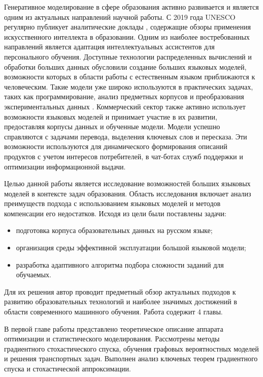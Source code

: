 Генеративное моделирование в сфере образования активно развивается и является одним из актуальных направлений научной работы. 
С 2019 года UNESCO регулярно публикует аналитические доклады \cite{annuvs2024education}\cite{unesco2019beijing},
содержащие обзоры применения искусственного интеллекта в образовании. Одним из наиболее востребованных направлений является адаптация
интеллектуальных ассистентов для персонального обучения. Доступные технологии распределенных вычислений и обработки больших данных обусловили 
создание больших языковых моделей, возможности которых в области работы с естественным языком приближаются к человеческим. Такие модели уже
широко используются в практических задачах, таких как программирование, анализ предметных корпусов и преобразования экспериментальных данных \cite{llamatouvron2023}. 
Коммерческий сектор также активно использует возможности языковых моделей и принимает участие в их развитии, предоставляя корпусы данных и обученные модели.
Модели успешно справляются с задачами перевода, выделения ключевых слов и пересказа. Эти возможности используются для динамического формирования описаний продуктов с 
учетом интересов потребителей, в чат-ботах служб поддержки и оптимизации информационной выдачи.

Целью данной работы является исследование возможностей больших языковых моделей в контексте задач образования. Область исследования
включает анализ преимуществ подхода с использованием языковых моделей и методов компенсации его недостатков. Исходя из цели были поставлены задачи:
\begin{itemize}
    \item подготовка корпуса образовательных данных на русском языке;
    \item организация среды эффективной эксплуатации большой языковой модели;
    \item разработка адаптивного алгоритма подбора сложности заданий для обучаемых.
\end{itemize}

Для их решения автор проводит предметный обзор актуальных подходов к развитию образовательных технологий и
наиболее значимых достижений в области современного машинного обучения. Работа содержит 4 главы.

В первой главе работы представлено теоретическое описание аппарата оптимизации и статистического моделирования. 
Рассмотрены методы градиентного стохастического спуска, обучения графовых вероятностных моделей и решения транспортных задач. 
Выполнен анализ ключевых теорем градиентного спуска и стохастической аппроксимации. 


